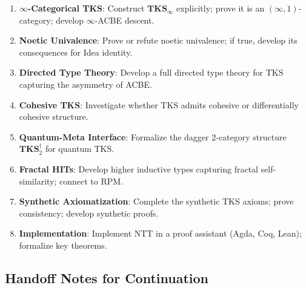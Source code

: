 \begin{enumerate}
  \item \textbf{$\infty$-Categorical TKS}: Construct $\mathbf{TKS}_\infty$ explicitly;
        prove it is an $(\infty, 1)$-category; develop $\infty$-ACBE descent.

  \item \textbf{Noetic Univalence}: Prove or refute noetic univalence; if true,
        develop its consequences for Idea identity.

  \item \textbf{Directed Type Theory}: Develop a full directed type theory for TKS
        capturing the asymmetry of ACBE.

  \item \textbf{Cohesive TKS}: Investigate whether TKS admits cohesive or
        differentially cohesive structure.

  \item \textbf{Quantum-Meta Interface}: Formalize the dagger 2-category structure
        $\mathbf{TKS}_2^{\dagger}$ for quantum TKS.

  \item \textbf{Fractal HITs}: Develop higher inductive types capturing fractal
        self-similarity; connect to RPM.

  \item \textbf{Synthetic Axiomatization}: Complete the synthetic TKS axioms;
        prove consistency; develop synthetic proofs.

  \item \textbf{Implementation}: Implement NTT in a proof assistant (Agda, Coq, Lean);
        formalize key theorems.
\end{enumerate}

\subsection{Handoff Notes for Continuation}
\label{subsec:meta-handoff-notes}

